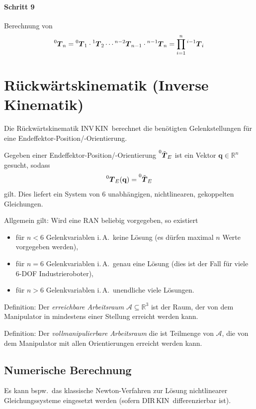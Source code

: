 \documentclass[a4paper, 11pt, accentcolor = tud3b]{tudreport}
\newcommand{\R}{\mathbb{R}}
\newcommand{\inreferenceto}[2]{\prescript{#1}{}{#2}}
\newcommand{\mat}[1]{\boldsymbol{#1}}
\renewcommand{\vec}[1]{\boldsymbol{\mathbf{#1}}}
\newcommand{\bspw}{bspw.~}
\newcommand{\iA}{i.\,A.~}
\newcommand{\DIRKIN}{DIR\,KIN~}
\newcommand{\INVKIN}{INV\,KIN~}
\begin{document}
					\paragraph{Schritt 9}
						Berechnung von
						\begin{equation*}
							\inreferenceto{0}{\mat{T}}_n = \inreferenceto{0}{\mat{T}}_1 \cdot \inreferenceto{1}{\mat{T}}_2 \cdots \inreferenceto{n - 2}{\mat{T}}_{n - 1} \cdot \inreferenceto{n - 1}{\mat{T}}_{n} = \prod_{i = 1}^{n} \inreferenceto{i - 1}{\mat{T}}_i
						\end{equation*}

		\section{Rückwärtskinematik (Inverse Kinematik)}
			Die Rückwärtskinematik \INVKIN berechnet die benötigten Gelenkstellungen für eine Endeffektor-Position/-Orientierung.
			
			Gegeben einer Endeffektor-Position/-Orientierung \( \inreferenceto{0}{\tilde{\mat{T}}}_E \) ist ein Vektor \( \vec{q} \in \R^n \) gesucht, sodass
			\begin{equation*}
				\inreferenceto{0}{\mat{T}}_E(\vec{q}) = \inreferenceto{0}{\tilde{\mat{T}}}_E
			\end{equation*}
			gilt. Dies liefert ein System von \(6\) unabhängigen, nichtlinearen, gekoppelten Gleichungen.
			
			Allgemein gilt: Wird eine RAN beliebig vorgegeben, so existiert
			\begin{itemize}
				\item für \( n < 6 \) Gelenkvariablen \iA keine Lösung (es dürfen maximal \(n\) Werte vorgegeben werden),
				\item für \( n = 6 \) Gelenkvariablen \iA genau eine Lösung (dies ist der Fall für viele \num{6}-DOF Industrieroboter),
				\item für \( n > 6 \) Gelenkvariablen \iA unendliche viele Lösungen.
			\end{itemize}
		
			Definition: Der \emph{erreichbare Arbeitsraum} \(\mathcal{A} \subseteq \R^3\) ist der Raum, der von dem Manipulator in mindestens einer Stellung erreicht werden kann.
			
			Definition: Der \emph{vollmanipulierbare Arbeitsraum} die ist Teilmenge von \(\mathcal{A}\), die von dem Manipulator mit allen Orientierungen erreicht werden kann.

			\subsection{Numerische Berechnung}
				Es kann \bspw das klassische Newton-Verfahren zur Lösung nichtlinearer Gleichungssysteme eingesetzt werden (sofern \DIRKIN differenzierbar ist).
				
\end{document}

